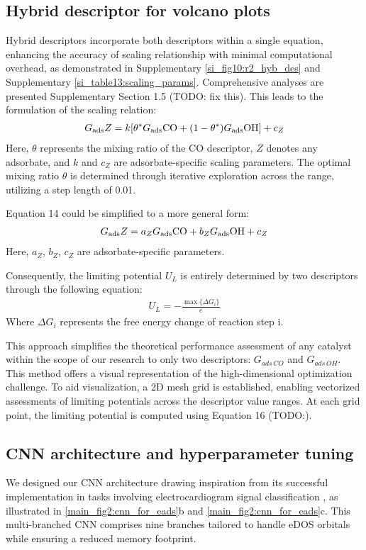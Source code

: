 \subsection{Hybrid descriptor for volcano plots}
Hybrid descriptors incorporate both descriptors within a single equation, enhancing the accuracy of scaling relationship with minimal computational overhead, as demonstrated in Supplementary \cref{si_fig10:r2_hyb_des} and Supplementary \cref{si_table13:scaling_params}.
Comprehensive analyses are presented Supplementary Section 1.5 (TODO: fix this). This leads to the formulation of the scaling relation:
\begin{align}
G_{\text{ads}} Z =
k[\theta^* G_{\text{ads}} \ce{CO} + (1-\theta^*) G_{\text{ads}} \ce{OH}] + c_Z  \label{main_eq13:scaling_relation}
\end{align}
Here, $\theta$ represents the mixing ratio of the CO descriptor, $\textit{Z}$ denotes any adsorbate, and $\textit{k}$ and $\textit{c}_{Z}$ are adsorbate-specific scaling parameters.
The optimal mixing ratio $\theta$ is determined through iterative exploration across the range, utilizing a step length of 0.01.

Equation 14 could be simplified to a more general form:
\begin{align}
G_{\text{ads}} Z =
a_Z G_{\text{ads}} \ce{CO} + b_Z G_{\text{ads}} \ce{OH} + c_Z  \label{main_eq14:general_scaling_relation}
\end{align}
Here, $a_Z$, $b_Z$, $c_Z$ are adsorbate-specific parameters.

Consequently, the limiting potential $\textit{U}_{L}$ is entirely determined by two descriptors through the following equation:
\begin{align}
U_L = -\frac{\max\{ \Delta G_i \}}{e}  \label{main_eq14:limiting_potential}
\end{align}
Where $\Delta G_{i}$ represents the free energy change of reaction step i.

This approach simplifies the theoretical performance assessment of any catalyst within the scope of our research to only two descriptors: $G_{\textit{ads} \, \textit{CO}}$ and $G_{\textit{ads} \, \textit{OH}}$.
This method offers a visual representation of the high-dimensional optimization challenge.
To aid visualization, a 2D mesh grid is established, enabling vectorized assessments of limiting potentials across the descriptor value ranges.
At each grid point, the limiting potential is computed using Equation 16 (TODO:).


\subsection{CNN architecture and hyperparameter tuning}
We designed our CNN architecture drawing inspiration from its successful implementation in tasks involving electrocardiogram signal classification \cite{weimann2021transfer}, as illustrated in \cref{main_fig2:cnn_for_eads}b and \cref{main_fig2:cnn_for_eads}c.
This multi-branched CNN comprises nine branches tailored to handle eDOS orbitals while ensuring a reduced memory footprint.

